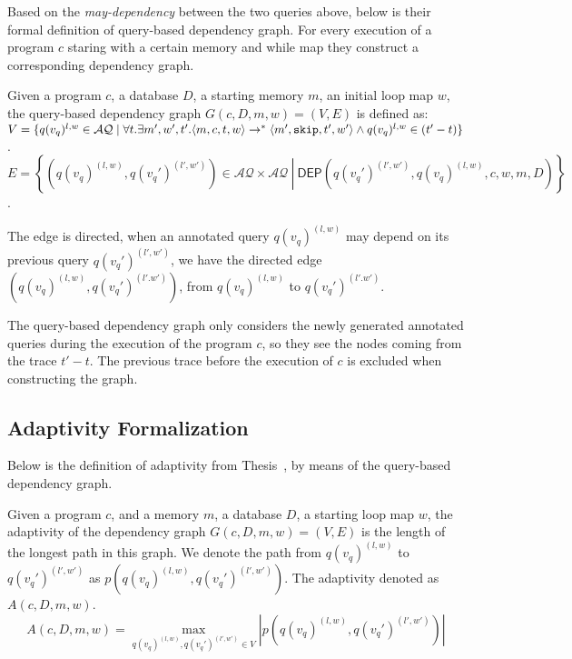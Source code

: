 %
Based on the \emph{may-dependency} between the two queries above,
below is their formal definition of query-based dependency graph. 
For every execution of a program $c$ staring with a certain memory and while map
they construct a corresponding dependency graph.  
\begin{defn}
Given a program $c$, a database $D$, a starting memory $m$, an initial loop map $w$, the query-based dependency graph $G(c,D,m,w) = (V, E)$ is defined as: \\
$V =\{q({v_q})^{l,w} \in \mathcal{AQ} \mid \forall t. \exists m',  w', t'.  \langle m ,c, t, w \rangle  \to^{*}  \langle m' , \mathtt{skip}, t', w'  \rangle  \land q({v_q})^{l,w} \in {(t'-t)}  \}$.
\\
$E = \left\{(q({v_q})^{(l,w)},q({v_q}')^{(l',w')}) \in \mathcal{AQ} \times \mathcal{AQ} 
~ \left \vert ~ \mathsf{DEP}(q({v_q}')^{(l',w')},q({v_q})^{(l,w)}, c,w,m,D)
 \right.\right\}$.
\end{defn}
%
The edge is directed, when an annotated query $q({v_q})^{(l,w)}$ may depend on its previous query $q({v_q}')^{(l',w')}$, we have the directed
edge $(q({v_q})^{(l,w)}, q({v_q}')^{(l'.w')})$, from $q({v_q})^{(l,w)} $ to $q({v_q}')^{(l'.w')}$.

The query-based dependency graph only considers the newly generated annotated queries during the execution of the program $c$,
so they see the nodes coming from the trace $t'-t$.
The previous trace before the execution of $c$ is excluded when constructing the graph.

\subsection*{Adaptivity Formalization}
Below is the definition of adaptivity from Thesis~\cite{weihao22}, by means of the query-based dependency graph. 
\begin{defn}
Given a program $c$, and a memory $m$, a database $D$, a starting loop map $w$, the adaptivity of the dependency graph $G(c, D,m,w) = (V, E)$ is the length of the longest path in this graph. We denote the path from $q({v_q})^{(l,w)}$ to $q({v_q}')^{(l',w')}$ as $p(q({v_q})^{(l,w)}, q({v_q}')^{(l',w')} )$. The adaptivity denoted as $A(c, D, m, w)$.
%
$$A(c, D, m, w) = \max\limits_{q({v_q})^{(l,w)},q({v_q}')^{(l',w')} \in V } |p(q({v_q})^{(l,w)}, q({v_q}')^{(l',w')} )| $$
\end{defn}

